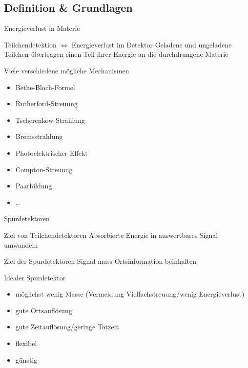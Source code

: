 
\subsection[]{Definition \& Grundlagen}





\begin{frame}{Energieverlust in Materie}
	\begin{block}{Teilchendetektion $\Leftrightarrow$ Energieverlust im Detektor}
		Geladene und ungeladene Teilchen übertragen einen Teil ihrer Energie an die
		durchdrungene Materie	
	\end{block}
	
	
	\begin{block}{Viele verschiedene mögliche Mechanismen}
		\begin{itemize}
		  \item Bethe-Bloch-Formel
		  \item Rutherford-Streuung
		  \item Tscherenkow-Strahlung
		  \item Bremsstrahlung
		  \item Photoelektrischer Effekt
		  \item Compton-Streuung
		  \item Paarbildung
		  \item \ldots
		\end{itemize}
	\end{block}
\end{frame}


\begin{frame}{Spurdetektoren}
	\begin{block}{Ziel von Teilchendetektoren}
		Absorbierte Energie in auswertbares Signal umwandeln 
	\end{block}
	\begin{block}{Ziel der Spurdetektoren}
		Signal muss Ortsinformation beinhalten
	\end{block}
	
	\begin{exampleblock}{Idealer Spurdetektor}
		\begin{itemize}
		  \item möglichst wenig Masse (Vermeidung Vielfachstreuung/wenig Energieverlust)
		  \item gute Ortsauflösung
		  \item gute Zeitauflösung/geringe Totzeit
		  \item flexibel
		  \item günstig 
		\end{itemize}
	\end{exampleblock}
\end{frame}

